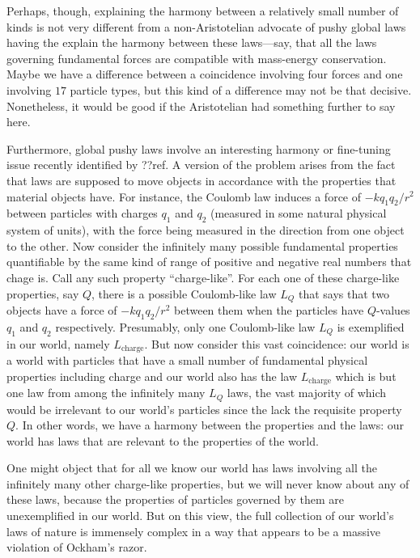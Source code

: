 Perhaps, though, explaining the harmony between a relatively small number of kinds is not very different from 
a non-Aristotelian advocate of pushy global laws having the explain the harmony between these laws---say, that 
all the laws governing fundamental forces are compatible with mass-energy conservation. Maybe we have a difference
between a coincidence involving four forces and one involving $17$ particle types, but this kind of a difference 
may not be that decisive. Nonetheless, it would be good if the Aristotelian had something further to say here.

Furthermore, global pushy laws involve an interesting harmony or fine-tuning issue recently identified by ??ref. A version 
of the problem arises from the fact that laws are supposed to move objects in accordance with the properties that 
material objects have. For instance, the Coulomb law induces a force of $-k q_1 q_2/r^2$ between particles with charges 
$q_1$ and $q_2$ (measured in some natural physical system of units), with the force being measured in the direction from 
one object to the other. Now consider the infinitely many possible 
fundamental properties quantifiable by the same kind of range of positive and negative real numbers
that chage is. Call any such property ``charge-like''. 
For each one of these
charge-like properties, say $Q$, there is a possible 
Coulomb-like law $L_Q$ that says that two objects have a force of $-k q_1 q_2/r^2$ between them when the particles have 
$Q$-values $q_1$ and $q_2$ respectively. Presumably, only one Coulomb-like law $L_Q$ is exemplified in our world, namely
$L_{\text{charge}}$. But now consider this vast coincidence: our world is a world with particles that have a small
number of fundamental physical properties including charge and our world also has the law $L_{\text{charge}}$ which is 
but one law from among the infinitely many $L_Q$ laws, the vast majority of which would be irrelevant to our world's 
particles since the lack the requisite property $Q$. In other words, we have a harmony between the properties and the laws: our world has laws that are relevant 
to the properties of the world.

One might object that for all we know our world has laws involving all the infinitely many other charge-like properties,
but we will never know about any of these laws, because the properties of particles governed by them are unexemplified
in our world. But on this view, the full collection of our world's laws of nature is immensely complex in a way that 
appears to be a massive violation of Ockham's razor. 

